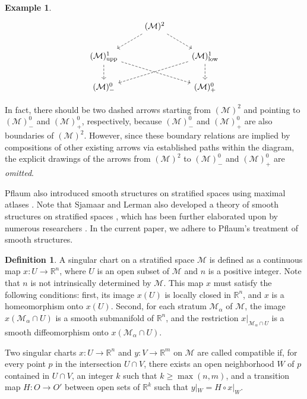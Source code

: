 \documentclass[12pt]{amsart}
\theoremstyle{definition}
\newtheorem{definition}[theorem]{Definition}
\newtheorem{example}[theorem]{Example}
\numberwithin{equation}{section}
\newcommand{\lowpart}{\mathrm{low}}
\begin{document}
{\begin{example}
	\begin{equation*}
		\begin{tikzcd}
			&(\mathcal{M})^2 \arrow[ld,dashed]\arrow[rd,dashed]&   \\
			(\mathcal{M})^1_{\mathrm{upp}} \arrow[d,dashed]\arrow[rrd,dashed]&&  (\mathcal{M})^1_{\lowpart} \arrow[d,dashed]\arrow[lld,dashed]       \\ (\mathcal{M})^0_{-} && (\mathcal{M})^0_{+}   
		\end{tikzcd}
	\end{equation*}
 

In fact, there should be two dashed arrows starting from $(\mathcal{M})^{2} $ and pointing to $(\mathcal{M})^{0}_{-}$ and $(\mathcal{M})^{0 }_{ +}$, respectively, because $(\mathcal{M})^{0}_{ -}$ and $(\mathcal{M})^{0 }_{ +}$ are also boundaries of $(\mathcal{M})^{2} $. However, since these boundary relations are implied by compositions of other existing arrows via established paths within the diagram,  {the explicit drawings of the arrows  from $(\mathcal{M})^{2} $   to $(\mathcal{M})^{0}_{ -}$ and $(\mathcal{M})^{0 }_{ +}$ are  \emph{omitted}}.

\end{example}
 

 Pflaum also introduced   smooth structures on stratified spaces using maximal atlases \cite{Pflaumpaper,Pflaumbook}.   Note that Sjamaar and Lerman also developed a   theory of smooth structures on   stratified spaces \cite{SLannals}, which has been further elaborated upon by numerous researchers \cite{BatesLerman1997,Huebschmann2004}. In the current paper, we adhere to Pflaum's treatment of smooth structures.

\begin{definition}
	A singular chart on a stratified space $\mathcal{M}$ is defined as a continuous map $x: U\to \mathbb{R}^n$, where $U$ is an open subset of $\mathcal{M}$ and $n$ is a positive integer. Note that $n$ is not intrinsically determined by $\mathcal{M}$. This map $x$ must satisfy the following conditions: first, its image $x(U)$ is locally closed in $\mathbb{R}^n$, and $x$ is a homeomorphism onto $x(U)$. Second, for each stratum $\mathcal{M}_{\alpha}$ of $\mathcal{M}$, the image $x(\mathcal{M}_{\alpha}\cap U)$ is a smooth submanifold of $\mathbb{R}^n$, and the restriction $x|_{\mathcal{M}_{\alpha}\cap U}$ is a smooth diffeomorphism onto $x(\mathcal{M}_{\alpha}\cap U)$.
	
	Two singular charts $x: U\to \mathbb{R}^n$ and $y: V\to \mathbb{R}^{m}$ on $\mathcal{M}$ are called compatible if, for every point $p$ in the intersection $U\cap V$, there exists an open neighborhood $W$ of $p$ contained in $U\cap V$, an integer $k$ such that $k\geqslant \max(n,m)$, and a transition map $H: O\to O'$ between open sets of $\mathbb{R}^{k}$ such that $y|_W = H\circ x|_W$.
	

\end{definition}}
\end{document}
